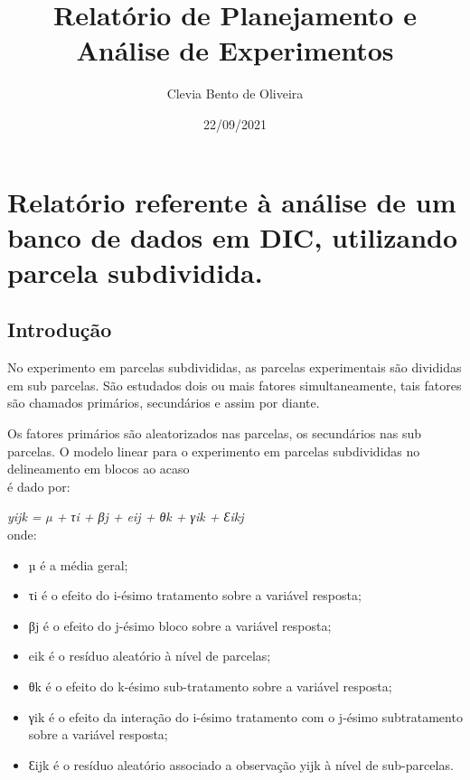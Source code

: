 \documentclass[
]{article}
\title{Relatório de Planejamento e Análise de Experimentos}
\author{Clevia Bento de Oliveira}
\date{22/09/2021}
\providecommand{\tightlist}{%
  \setlength{\itemsep}{0pt}\setlength{\parskip}{0pt}}
\begin{document}
\maketitle

\hypertarget{relatuxf3rio-referente-uxe0-anuxe1lise-de-um-banco-de-dados-em-dic-utilizando-parcela-subdividida.}{%
\section{Relatório referente à análise de um banco de dados em DIC,
utilizando parcela
subdividida.}\label{relatuxf3rio-referente-uxe0-anuxe1lise-de-um-banco-de-dados-em-dic-utilizando-parcela-subdividida.}}

\hypertarget{introduuxe7uxe3o}{%
\subsection{Introdução}\label{introduuxe7uxe3o}}

No experimento em parcelas subdivididas, as parcelas experimentais são
divididas em sub parcelas. São estudados dois ou mais fatores
simultaneamente, tais fatores são chamados primários, secundários e
assim por diante.

Os fatores primários são aleatorizados nas parcelas, os secundários nas
sub parcelas. O modelo linear para o experimento em parcelas
subdivididas no delineamento em blocos ao acaso\\
é dado por:

\emph{yijk = µ + τi + βj + eij + θk + γik + Ɛikj}\\
onde:

\begin{itemize}
\tightlist
\item
  µ é a média geral;
\item
  τi é o efeito do i-ésimo tratamento sobre a variável resposta;
\item
  βj é o efeito do j-ésimo bloco sobre a variável resposta;
\item
  eik é o resíduo aleatório à nível de parcelas;
\item
  θk é o efeito do k-ésimo sub-tratamento sobre a variável resposta;
\item
  γik é o efeito da interação do i-ésimo tratamento com o j-ésimo
  subtratamento sobre a variável resposta;
\item
  Ɛijk é o resíduo aleatório associado a observação yijk à nível de
  sub-parcelas.
\end{itemize}
\end{document}
